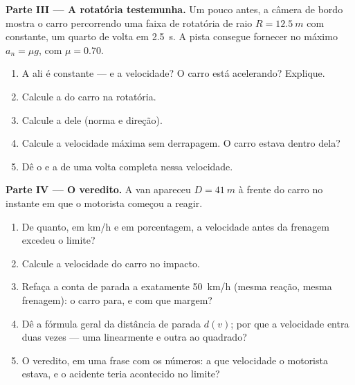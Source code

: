 \begin{problem}
\medskip
\noindent\textbf{Parte III --- A rotatória testemunha.}
Um pouco antes, a câmera de bordo mostra o carro percorrendo uma faixa de
rotatória de raio $R = \qty{12.5}{m}$ com  constante,
um quarto de volta em \qty{2.5}{s}. A pista consegue fornecer no máximo
$a_n = \mu g$, com $\mu = 0.70$.
\begin{enumerate}[resume]
  \item A  ali é constante --- e a velocidade? O carro
        está acelerando? Explique.
  \item Calcule a  do carro na rotatória.
  \item Calcule a  dele (norma e direção).
  \item Calcule a velocidade máxima sem derrapagem. O carro estava dentro
        dela?
  \item Dê o  e a  de uma volta completa nessa
        velocidade.
\end{enumerate}

\medskip
\noindent\textbf{Parte IV --- O veredito.}
A van apareceu $D = \qty{41}{m}$ à frente do carro no instante em que o
motorista começou a reagir.
\begin{enumerate}[resume]
  \item De quanto, em \unit{km/h} e em porcentagem, a velocidade antes da
        frenagem excedeu o limite?
  \item Calcule a velocidade do carro no impacto.
  \item Refaça a conta de parada a exatamente \qty{50}{km/h} (mesma
        reação, mesma frenagem): o carro para, e com que margem?
  \item Dê a fórmula geral da distância de parada $d(v)$; por que a
        velocidade entra duas vezes --- uma linearmente e outra ao
        quadrado?
  \item O veredito, em uma frase com os números: a que velocidade o
        motorista estava, e o acidente teria acontecido no limite?
\end{enumerate}
\end{problem}
